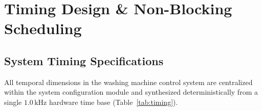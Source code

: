 \section{Timing Design \& Non-Blocking Scheduling}
\label{sec:timing}

\subsection{System Timing Specifications}

All temporal dimensions in the washing machine control system are centralized within
the system configuration module and synthesized deterministically from a single $1.0\,\text{kHz}$
hardware time base (Table~\ref{tab:timing}).

